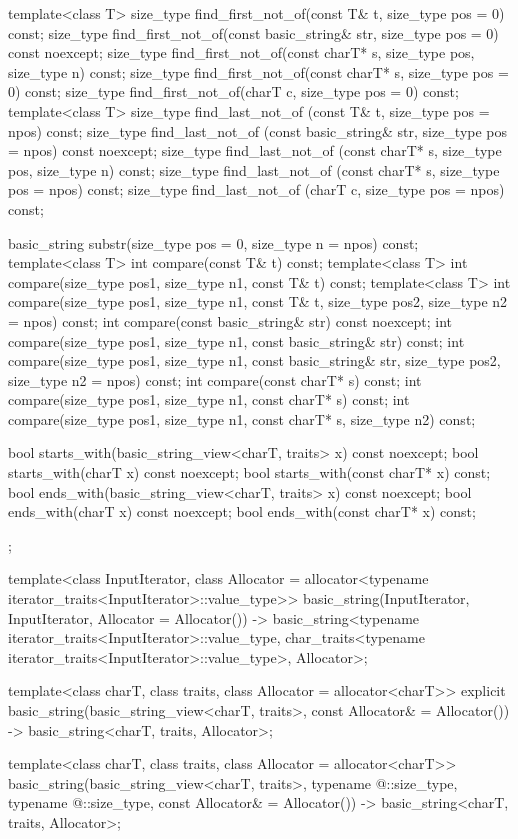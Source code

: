 \begin{codeblock}
{{    template<class T>
      size_type find_first_not_of(const T& t, size_type pos = 0) const;
    size_type find_first_not_of(const basic_string& str, size_type pos = 0) const noexcept;
    size_type find_first_not_of(const charT* s, size_type pos, size_type n) const;
    size_type find_first_not_of(const charT* s, size_type pos = 0) const;
    size_type find_first_not_of(charT c, size_type pos = 0) const;
    template<class T>
      size_type find_last_not_of (const T& t, size_type pos = npos) const;
    size_type find_last_not_of (const basic_string& str, size_type pos = npos) const noexcept;
    size_type find_last_not_of (const charT* s, size_type pos, size_type n) const;
    size_type find_last_not_of (const charT* s, size_type pos = npos) const;
    size_type find_last_not_of (charT c, size_type pos = npos) const;

    basic_string substr(size_type pos = 0, size_type n = npos) const;
    template<class T>
      int compare(const T& t) const;
    template<class T>
      int compare(size_type pos1, size_type n1, const T& t) const;
    template<class T>
      int compare(size_type pos1, size_type n1, const T& t,
                  size_type pos2, size_type n2 = npos) const;
    int compare(const basic_string& str) const noexcept;
    int compare(size_type pos1, size_type n1, const basic_string& str) const;
    int compare(size_type pos1, size_type n1, const basic_string& str,
                size_type pos2, size_type n2 = npos) const;
    int compare(const charT* s) const;
    int compare(size_type pos1, size_type n1, const charT* s) const;
    int compare(size_type pos1, size_type n1, const charT* s, size_type n2) const;

    bool starts_with(basic_string_view<charT, traits> x) const noexcept;
    bool starts_with(charT x) const noexcept;
    bool starts_with(const charT* x) const;
    bool ends_with(basic_string_view<charT, traits> x) const noexcept;
    bool ends_with(charT x) const noexcept;
    bool ends_with(const charT* x) const;
  };

  template<class InputIterator,
           class Allocator = allocator<typename iterator_traits<InputIterator>::value_type>>
    basic_string(InputIterator, InputIterator, Allocator = Allocator())
      -> basic_string<typename iterator_traits<InputIterator>::value_type,
                      char_traits<typename iterator_traits<InputIterator>::value_type>,
                      Allocator>;

  template<class charT,
           class traits,
           class Allocator = allocator<charT>>
    explicit basic_string(basic_string_view<charT, traits>, const Allocator& = Allocator())
      -> basic_string<charT, traits, Allocator>;

  template<class charT,
           class traits,
           class Allocator = allocator<charT>>
    basic_string(basic_string_view<charT, traits>,
                 typename @\seebelow@::size_type, typename @\seebelow@::size_type,
                 const Allocator& = Allocator())
      -> basic_string<charT, traits, Allocator>;
}
\end{codeblock}

